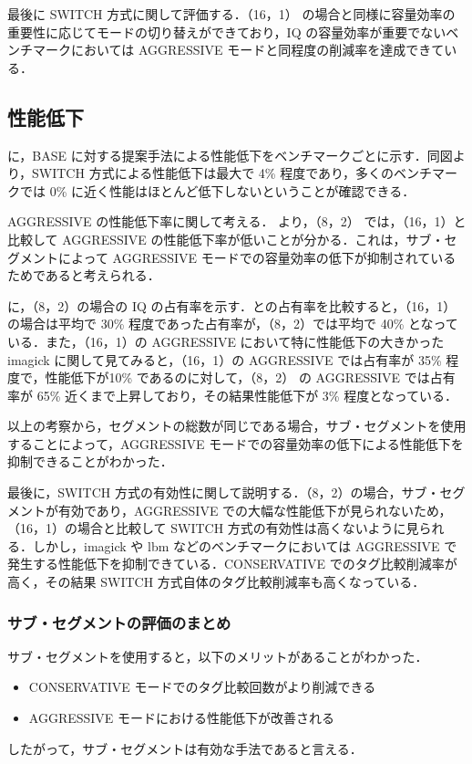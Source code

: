 最後に SWITCH 方式に関して評価する．（16，1） の場合と同様に容量効率の重要性に応じてモードの切り替えができており，IQ の容量効率が重要でないベンチマークにおいては AGGRESSIVE モードと同程度の削減率を達成できている．

\subsection{性能低下}
に，BASE に対する提案手法による性能低下をベンチマークごとに示す．同図より，SWITCH 方式による性能低下は最大で 4\% 程度であり，多くのベンチマークでは 0\% に近く性能はほとんど低下しないということが確認できる．

AGGRESSIVE の性能低下率に関して考える． より，（8，2） では，（16，1）と比較して AGGRESSIVE の性能低下率が低いことが分かる．これは，サブ・セグメントによって AGGRESSIVE モードでの容量効率の低下が抑制されているためであると考えられる．

 に，（8，2）の場合の IQ の占有率を示す．との占有率を比較すると，（16，1）の場合は平均で 30\% 程度であった占有率が，（8，2）では平均で 40\% となっている．また，（16，1）の AGGRESSIVE において特に性能低下の大きかった imagick に関して見てみると，（16，1）の AGGRESSIVE では占有率が 35\% 程度で，性能低下が10\% であるのに対して，（8，2） の AGGRESSIVE では占有率が 65\% 近くまで上昇しており，その結果性能低下が 3\% 程度となっている．

以上の考察から，セグメントの総数が同じである場合，サブ・セグメントを使用することによって，AGGRESSIVE モードでの容量効率の低下による性能低下を抑制できることがわかった．

最後に，SWITCH 方式の有効性に関して説明する．（8，2）の場合，サブ・セグメントが有効であり，AGGRESSIVE での大幅な性能低下が見られないため，（16，1）の場合と比較して SWITCH 方式の有効性は高くないように見られる．しかし，imagick や lbm などのベンチマークにおいては AGGRESSIVE で発生する性能低下を抑制できている．CONSERVATIVE でのタグ比較削減率が高く，その結果 SWITCH 方式自体のタグ比較削減率も高くなっている．

\subsubsection{サブ・セグメントの評価のまとめ}
サブ・セグメントを使用すると，以下のメリットがあることがわかった．
\begin{itemize}
  \item CONSERVATIVE モードでのタグ比較回数がより削減できる
  \item AGGRESSIVE モードにおける性能低下が改善される
\end{itemize}
したがって，サブ・セグメントは有効な手法であると言える．

